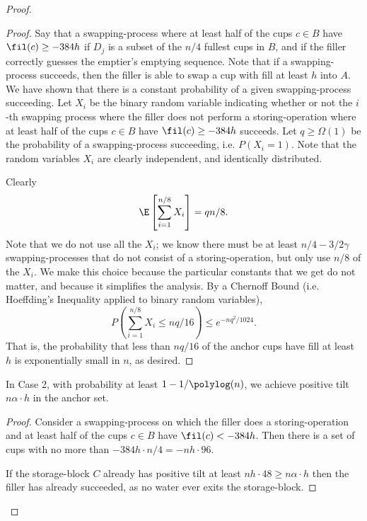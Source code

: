 \begin{proof}
\begin{proof}
  Say that a swapping-process where at least half of the cups $c\in B$ have
  $\fil(c) \ge -384h$  if $D_j$ is a subset of the $n/4$ fullest
  cups in $B$, and if the filler correctly guesses the emptier's emptying
  sequence. Note that if a swapping-process succeeds, then the filler is able
  to swap a cup with fill at least $h$ into $A$. We have shown that there is a
  constant probability of a given swapping-process succeeding. Let $X_i$ be the
  binary random variable indicating whether or not the $i$-th swapping process
  where the filler does not perform a storing-operation where at least half of
  the cups $c\in B$ have $\fil(c) \ge -384h$ succeeds. Let $q \ge \Omega(1)$ be
  the probability of a swapping-process succeeding, i.e. $P(X_i=1)$. Note that
  the random variables $X_i$ are clearly independent, and identically
  distributed.

  Clearly $$\E\left[\sum_{i=1}^{n/8} X_i\right] = qn/8.$$ Note that we do not
  use all the $X_i$; we know there must be at least $n/4 - 3/2 \gamma$
  swapping-processes that do not consist of a storing-operation, but only use
  $n/8$ of the $X_i$. We make this choice because the particular constants that
  we get do not matter, and because it simplifies the analysis.
  By a Chernoff Bound (i.e. Hoeffding's Inequality applied to binary random variables),
  $$P\left(\sum_{i=1}^{n/8} X_i\le nq/16\right) \le e^{-nq^2/1024}.$$ That is, the
  probability that less than $nq/16$ of the anchor cups have fill at least $h$ is
  exponentially small in $n$, as desired.

\end{proof}

\begin{clm}
  \label{clm:xtreme}
  In Case 2, with probability at least $1- 1/\polylog(n)$, we achieve positive
  tilt $n \alpha \cdot h$ in the anchor set.
\end{clm}

\begin{proof}
  Consider a swapping-process on which the filler does a storing-operation and
  at least half of the cups $c \in B$ have $\fil(c) < -384h$. Then there is a
  set of cups with no more than $-384h \cdot n/4 = -nh\cdot 96$.

  If the storage-block $C$ already has positive tilt at least $nh\cdot 48 \ge
  n\alpha \cdot h$ then the filler has already succeeded, as no water ever
  exits the storage-block.


\end{proof}
\end{proof}
